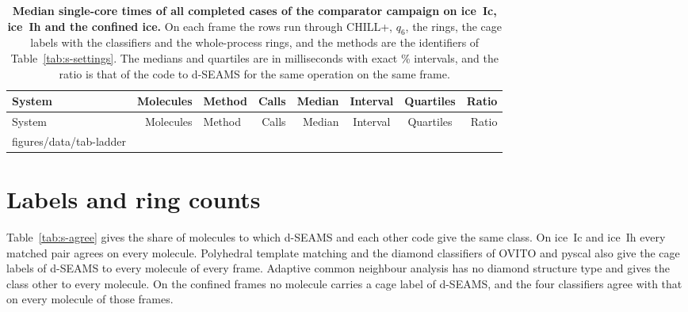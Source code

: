 \documentclass[preprint,12pt]{elsarticle}
\makeatletter
\newcommand{\tabbody}[1]{\@@input #1 }
\makeatother
\begin{document}
\begin{landscape}
\footnotesize \setlength{\tabcolsep}{4pt}
\setlength{\LTcapwidth}{\linewidth}
\begin{longtable}{@{}lrlrrccr@{}}
\caption{\textbf{Median single-core times of all  completed cases of the comparator campaign on ice~Ic, ice~Ih and the confined ice.}
On each frame the rows run through CHILL+, $q_6$, the rings, the cage labels with the classifiers and the whole-process rings, and the methods are the identifiers of Table~\ref{tab:s-settings}.
The medians and quartiles are in milliseconds with exact \% intervals, and the ratio is that of the code to d-SEAMS for the same operation on the same frame.}
\label{tab:s-ladder}\\
\toprule
System & Molecules & Method & Calls & Median & Interval & Quartiles & Ratio\\
\midrule
\endfirsthead
\toprule
System & Molecules & Method & Calls & Median & Interval & Quartiles & Ratio\\
\midrule
\endhead
\tabbody{figures/data/tab-ladder}
\bottomrule
\end{longtable}
\end{landscape}

\section{Labels and ring counts}
\label{sec:s-labels}

Table~\ref{tab:s-agree} gives the share of molecules to which d-SEAMS
and each other code give the same class.
On ice~Ic and ice~Ih every matched pair agrees on every molecule.
Polyhedral template matching and the diamond classifiers of OVITO and
pyscal also give the cage labels of d-SEAMS to every molecule of every
frame.
Adaptive common neighbour analysis has no diamond structure type and
gives the class other to every molecule.
On the confined frames no molecule carries a cage label of d-SEAMS, and
the four classifiers agree with that on every molecule of those frames.
\end{document}
